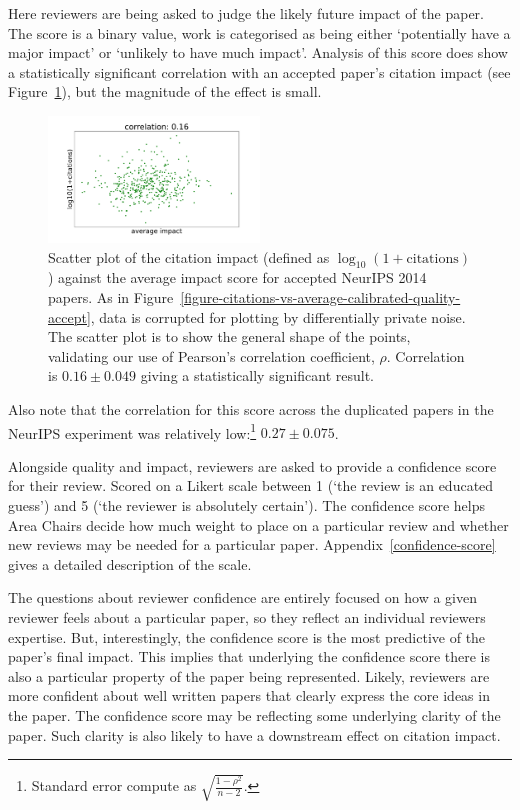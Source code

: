 \documentclass[twoside]{article}
\begin{document}
Here reviewers are being asked to judge the likely future impact of
the paper. The score is a binary value, work is categorised as being
either `potentially have a major impact' or `unlikely to have much
impact'. Analysis of this score does show a statistically significant
correlation with an accepted paper's citation impact (see Figure~\ref{figure-citations-vs-average-impact-accept}), but the magnitude of
the effect is small.

\begin{figure}[htb]
  \begin{center}
    \includegraphics[width=0.5\textwidth]{diagrams/neurips/citations-vs-average-impact-accept.pdf}
  \end{center}
  \caption{Scatter plot of the citation impact (defined as
    $\log_{10}(1+\text{citations})$) against the average impact score
    for accepted NeurIPS 2014 papers. As in Figure~\ref{figure-citations-vs-average-calibrated-quality-accept}, data
    is corrupted for plotting by differentially private noise. The
    scatter plot is to show the general shape of the points,
    validating our use of Pearson's correlation coefficient,
    $\rho$. Correlation is $0.16 \pm 0.049$ giving a statistically
    significant result.}
  \label{figure-citations-vs-average-impact-accept}
\end{figure}

Also note that the correlation for this score across the duplicated
papers in the NeurIPS experiment was relatively low:\footnote{Standard
  error compute as $\sqrt{\frac{1-\rho^2}{n-2}}$.} $0.27 \pm 0.075$.

Alongside quality and impact, reviewers are asked to provide a
confidence score for their review. Scored on a Likert scale between 1
(`the review is an educated guess') and 5 (`the reviewer is absolutely
certain'). The confidence score helps Area Chairs decide how much
weight to place on a particular review and whether new reviews may be
needed for a particular paper. Appendix~\ref{confidence-score} gives a
detailed description of the scale.

The questions about reviewer confidence are entirely focused on how a
given reviewer feels about a particular paper, so they reflect an
individual reviewers expertise. But, interestingly, the confidence
score is the most predictive of the paper's final impact. This implies
that underlying the confidence score there is also a particular
property of the paper being represented. Likely, reviewers are more
confident about well written papers that clearly express the core
ideas in the paper. The confidence score may be reflecting some
underlying clarity of the paper. Such clarity is also likely to have a
downstream effect on citation impact.
\end{document}
